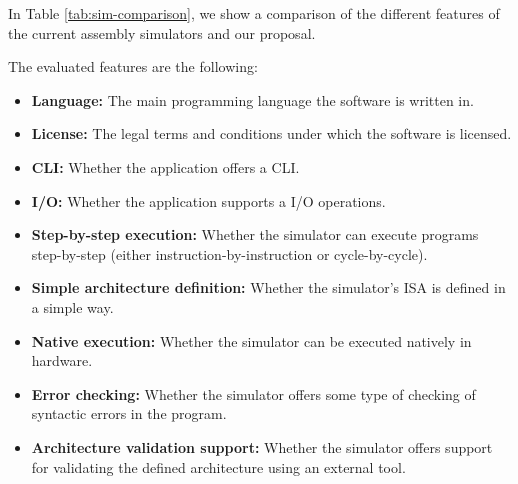 
In Table \ref{tab:sim-comparison}, we show a comparison of the different features of the current assembly simulators and our proposal.

The evaluated features are the following:
\begin{itemize}
  \item \textbf{Language:} The main \gls{programming language} the software is written in.
  \item \textbf{License:} The legal terms and conditions under which the software is licensed.
  \item \textbf{\gls{CLI}:} Whether the application offers a \gls{CLI}.
  \item \textbf{\gls{I/O}:} Whether the application supports a \gls{I/O} operations.
  \item \textbf{Step-by-step execution:} Whether the simulator can execute programs step-by-step (either instruction-by-instruction or cycle-by-cycle).
  \item \textbf{Simple architecture definition:} Whether the simulator's \gls{ISA} is defined in a simple way.
  \item \textbf{Native execution:} Whether the simulator can be executed natively in hardware.
  \item \textbf{Error checking:} Whether the simulator offers some type of checking of syntactic errors in the program.
  \item \textbf{Architecture validation support:} Whether the simulator offers support for validating the defined architecture using an external tool.
\end{itemize}

